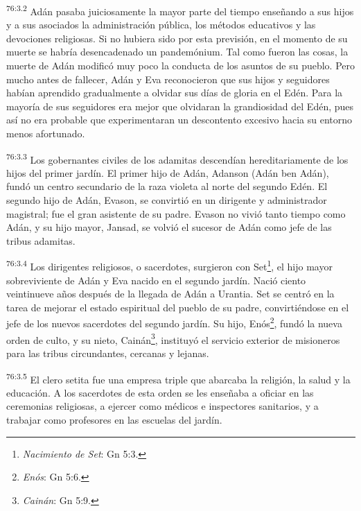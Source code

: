 \par
\textsuperscript{76:3.2} Adán pasaba juiciosamente la mayor parte del tiempo enseñando a sus hijos y a sus asociados la administración pública, los métodos educativos y las devociones religiosas. Si no hubiera sido por esta previsión, en el momento de su muerte se habría desencadenado un pandemónium. Tal como fueron las cosas, la muerte de Adán modificó muy poco la conducta de los asuntos de su pueblo. Pero mucho antes de fallecer, Adán y Eva reconocieron que sus hijos y seguidores habían aprendido gradualmente a olvidar sus días de gloria en el Edén. Para la mayoría de sus seguidores era mejor que olvidaran la grandiosidad del Edén, pues así no era probable que experimentaran un descontento excesivo hacia su entorno menos afortunado.

\par
\textsuperscript{76:3.3} Los gobernantes civiles de los adamitas descendían hereditariamente de los hijos del primer jardín. El primer hijo de Adán, Adanson (Adán ben Adán), fundó un centro secundario de la raza violeta al norte del segundo Edén. El segundo hijo de Adán, Evason, se convirtió en un dirigente y administrador magistral; fue el gran asistente de su padre. Evason no vivió tanto tiempo como Adán, y su hijo mayor, Jansad, se volvió el sucesor de Adán como jefe de las tribus adamitas.

\par
\textsuperscript{76:3.4} Los dirigentes religiosos, o sacerdotes, surgieron con Set\footnote{\textit{Nacimiento de Set}: Gn 5:3.}, el hijo mayor sobreviviente de Adán y Eva nacido en el segundo jardín. Nació ciento veintinueve años después de la llegada de Adán a Urantia. Set se centró en la tarea de mejorar el estado espiritual del pueblo de su padre, convirtiéndose en el jefe de los nuevos sacerdotes del segundo jardín. Su hijo, Enós\footnote{\textit{Enós}: Gn 5:6.}, fundó la nueva orden de culto, y su nieto, Cainán\footnote{\textit{Cainán}: Gn 5:9.}, instituyó el servicio exterior de misioneros para las tribus circundantes, cercanas y lejanas.

\par
\textsuperscript{76:3.5} El clero setita fue una empresa triple que abarcaba la religión, la salud y la educación. A los sacerdotes de esta orden se les enseñaba a oficiar en las ceremonias religiosas, a ejercer como médicos e inspectores sanitarios, y a trabajar como profesores en las escuelas del jardín.

